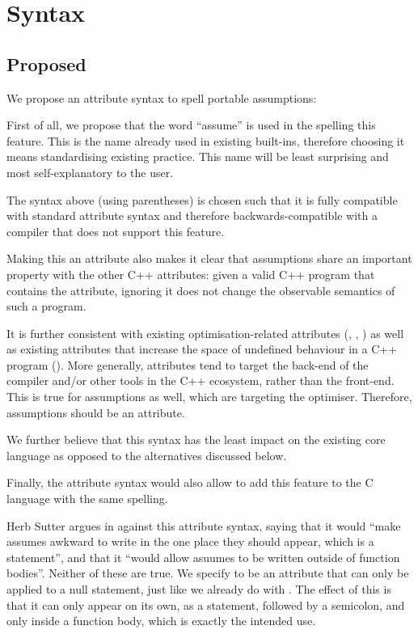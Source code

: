 

\section{Syntax}


\subsection{Proposed}

We propose an attribute syntax to spell portable assumptions:

\forceindent
{}

First of all, we propose that the word ``assume'' is used in the spelling this feature. This is the name already used in existing built-ins, therefore choosing it means standardising existing practice. This name will be least surprising and most self-explanatory to the user.

The syntax above (using parentheses) is chosen such that it is fully compatible with standard attribute syntax and therefore backwards-compatible with a compiler that does not support this feature. 

Making this an attribute also makes it clear that assumptions share an important property with the other C++ attributes: given a valid C++ program that contains the attribute, ignoring it does not change the observable semantics of such a program.

It is further consistent with existing optimisation-related attributes (\tcode{[[likely]]}, \tcode{[[unlikely]]}, ) as well as existing attributes that increase the space of undefined behaviour in a C++ program (\tcode{[[noreturn]]}). More generally, attributes tend to target the back-end of the compiler and/or other tools in the C++ ecosystem, rather than the front-end. This is true for assumptions as well, which are targeting the optimiser. Therefore, assumptions should be an attribute.

We further believe that this syntax has the least impact on the existing core language as opposed to the alternatives discussed below.

Finally, the attribute syntax would also allow to add this feature to the C language with the same spelling.

Herb Sutter argues in \cite{P2064R0} against this attribute syntax, saying that it would ``make assumes awkward to write in the one place they should appear, which is a statement'', and that it ``would allow asuumes to be written outside of function bodies''. Neither of these are true. We specify  to be an attribute that can only be applied to a null statement, just like we already do with \tcode{[[fallthrough]]}. The effect of this is that it can only appear on its own, as a statement, followed by a semicolon, and only inside a function body, which is exactly the intended use.

